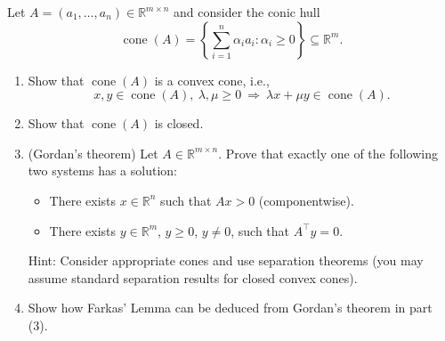 \documentclass[11pt,letter,notitlepage]{article}
\theoremstyle{definition}
\begin{document}
    \begin{exercise}
        Let \(A=(a_{1},\ldots,a_{n})\in\mathbb{R}^{m\times n}\) and consider the conic hull
        \[\operatorname{cone}(A)=\left\{\sum_{i=1}^{n}\alpha_{i}a_{i}:\alpha_{i}\geq 0\right\}\subseteq\mathbb{R}^{m}.\]
        
        \begin{enumerate}[label=(\arabic*)]
        \item Show that \(\operatorname{cone}(A)\) is a convex cone, i.e.,
        \[x,y\in\operatorname{cone}(A),\ \lambda,\mu\geq 0\ \Rightarrow\ \lambda x+\mu y\in\operatorname{cone}(A).\]
        
        \item Show that \(\operatorname{cone}(A)\) is closed.
        
        \item (Gordan's theorem) Let \(A\in\mathbb{R}^{m\times n}\). Prove that exactly one of the following two systems has a solution:
        \begin{itemize}
            \item There exists \(x\in\mathbb{R}^{n}\) such that \(Ax>0\) (componentwise).
            \item There exists \(y\in\mathbb{R}^{m}\), \(y\geq 0\), \(y\neq 0\), such that \(A^{\top}y=0\).
        \end{itemize}
        Hint: Consider appropriate cones and use separation theorems (you may assume standard separation results for closed convex cones).
        
        \item Show how Farkas' Lemma can be deduced from Gordan's theorem in part (3).
        \end{enumerate}
    \end{exercise}

    \newpage
    
    
	
\end{document}

